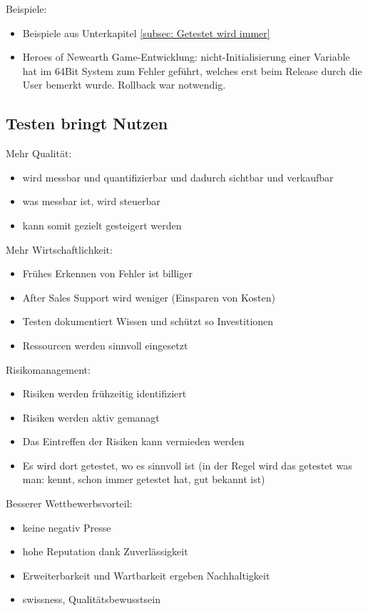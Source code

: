 Beispiele:
\begin{itemize}
    \item Beispiele aus Unterkapitel \ref{subsec: Getestet wird immer}
    \item Heroes of Newearth Game-Entwicklung: nicht-Initialisierung einer Variable hat im 64Bit System zum Fehler geführt, welches erst beim Release durch die User bemerkt wurde. Rollback war notwendig.
\end{itemize}

\subsection{Testen bringt Nutzen}
Mehr Qualität:
\begin{itemize}
    \item wird messbar und quantifizierbar und dadurch sichtbar und verkaufbar
    \item was messbar ist, wird steuerbar
    \item kann somit gezielt gesteigert werden
\end{itemize}

Mehr Wirtschaftlichkeit:
\begin{itemize}
    \item Frühes Erkennen von Fehler ist billiger
    \item After Sales Support wird weniger (Einsparen von Kosten)
    \item Testen dokumentiert Wissen und schützt so Investitionen
    \item Ressourcen werden sinnvoll eingesetzt
\end{itemize}

Risikomanagement:
\begin{itemize}
    \item Risiken werden frühzeitig identifiziert
    \item Risiken werden aktiv gemanagt
    \item Das Eintreffen der Risiken kann vermieden werden
    \item Es wird dort getestet, wo es sinnvoll ist (in der Regel wird das getestet was man: kennt, schon immer getestet hat, gut bekannt ist)
\end{itemize}

Besserer Wettbewerbsvorteil:
\begin{itemize}
    \item keine negativ Presse
    \item hohe Reputation dank Zuverlässigkeit
    \item Erweiterbarkeit und Wartbarkeit ergeben Nachhaltigkeit
    \item swissness, Qualitätsbewusstsein
\end{itemize}


